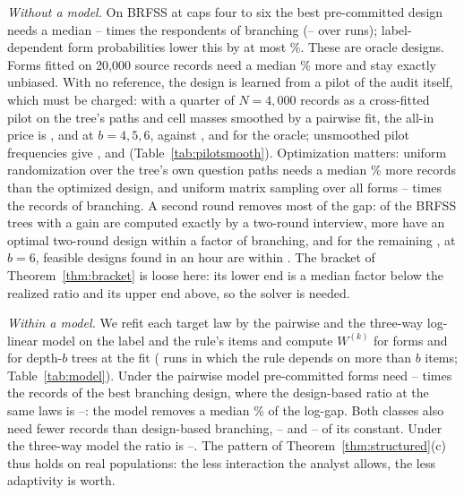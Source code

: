 \emph{Without a model.} On BRFSS at caps four to six the best pre-committed design needs a median \nScreenBestLo--\nScreenBestHi{} times the respondents of branching (\nScreenRunLo--\nScreenRunHi{} over runs); label-dependent form probabilities lower this by at most \nLabelMax\%. These are oracle designs. Forms fitted on 20,000 source records need a median \nFitMed\% more and stay exactly unbiased. With no reference, the design is learned from a pilot of the audit itself, which must be charged: with a quarter of $N=4{,}000$ records as a cross-fitted pilot on the tree's paths and cell masses smoothed by a pairwise fit, the all-in price is \nSmoothFourc, \nSmoothFivec{} and \nSmoothSixc{} at $b=4,5,6$, against \nSmoothFourBest, \nSmoothFiveBest{} and \nSmoothSixBest{} for the oracle; unsmoothed pilot frequencies give \nSmoothEmpFourc, \nSmoothEmpFivec{} and \nSmoothEmpSixc{} (Table~\ref{tab:pilotsmooth}). Optimization matters: uniform randomization over the tree's own question paths needs a median \nUpsOverMed\% more records than the optimized design, and uniform matrix sampling over all forms \nUnifLo--\nUnifHi{} times the records of branching. A second round removes most of the gap: \nGainComputable{} of the \nScreenGainN{} BRFSS trees with a gain are computed exactly by a two-round interview, \nGainExactNon{} more have an optimal two-round design within a factor \nScreenTwoMax{} of branching, and for the remaining \nTwoBounded, at $b=6$, feasible designs found in an hour are within \nTwoBoundMax. The bracket of Theorem~\ref{thm:bracket} is loose here: its lower end is a median factor \nLowUnder{} below the realized ratio and its upper end \nNpOver{} above, so the solver is needed.

\emph{Within a model.} We refit each target law by the pairwise and the three-way log-linear model on the label and the rule's items and compute $W^{(k)}$ for forms and for depth-$b$ trees at the fit (\nModelRuns{} runs in which the rule depends on more than $b$ items; Table~\ref{tab:model}). Under the pairwise model pre-committed forms need \nModelTwoLo--\nModelTwoHi{} times the records of the best branching design, where the design-based ratio at the same laws is \nModelDesignLo--\nModelDesignHi: the model removes a median \nModelTwoRemoved\% of the log-gap. Both classes also need fewer records than design-based branching, \nModelTwoFixLo--\nModelTwoFixHi{} and \nModelTwoBrLo--\nModelTwoBrHi{} of its constant. Under the three-way model the ratio is \nModelThreeLo--\nModelThreeHi. The pattern of Theorem~\ref{thm:structured}(c) thus holds on real populations: the less interaction the analyst allows, the less adaptivity is worth.

